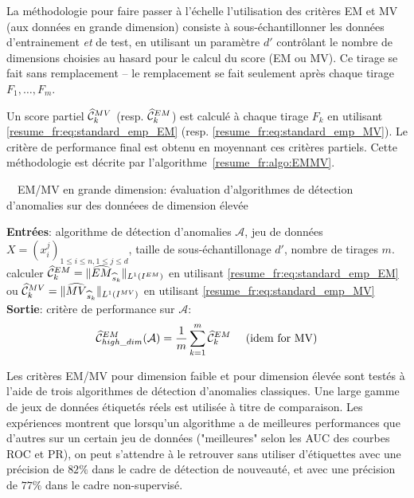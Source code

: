 La méthodologie pour faire passer à l'échelle l'utilisation des critères EM et MV (aux données en grande dimension) consiste à sous-échantillonner les données d'entrainement \emph{et} de test, en utilisant un paramètre $d'$ contrôlant le nombre de dimensions choisies au hasard pour le calcul du score (EM ou MV).
Ce tirage se fait sans remplacement -- le remplacement se fait seulement après chaque tirage $ F_1, \ldots, F_ {m} $.

Un score partiel $\widehat {\mathcal{C}}_k^{MV}$ (resp. $\widehat {\mathcal{C}}_k^{EM}$) est calculé à chaque tirage $F_k$ en utilisant \eqref{resume_fr:eq:standard_emp_EM} (resp. \eqref{resume_fr:eq:standard_emp_MV}). Le critère de performance final est obtenu en moyennant ces critères partiels. Cette méthodologie est décrite par l'algorithme~\ref{resume_fr:algo:EMMV}.
%
\begin{algorithm}[!tbh]
\caption{~~EM/MV en grande dimension: évaluation d'algorithmes de détection d'anomalies sur des donnéees de dimension élevée}
\label{resume_fr:algo:EMMV}
\begin{algorithmic}
  \STATE \textbf{Entrées}: algorithme de détection d'anomalies $\mathcal{A}$, jeu de données $X = (x^j_i)_{1 \le i \le n, 1 \le j \le d }$, taille de sous-échantillonage $d'$, nombre de tirages $m$.
    \STATE calculer $\widehat{\mathcal{C}}_k^{EM} = \| \widehat{EM}_{\widehat s_k} \|_{L^1(I^{EM})}$ en utilisant \eqref{resume_fr:eq:standard_emp_EM} ou $\widehat{\mathcal{C}}_k^{MV} = \| \widehat{MV}_{\widehat s_k} \|_{L^1(I^{MV})}$ en utilisant \eqref{resume_fr:eq:standard_emp_MV}
  \ENDFOR 
  \STATE \textbf{Sortie}: critère de performance sur $\mathcal{A}$: $$\widehat{\mathcal{C}}^{EM}_{high\_dim} (\mathcal{A})= \frac{1}{m} \sum_{k=1}^m\widehat {\mathcal{C}}_k^{EM} \text{~~~~(idem for MV)}$$
\end{algorithmic}
\end{algorithm}

Les critères EM/MV pour dimension faible et pour dimension élevée sont testés à l'aide de trois algorithmes de détection d'anomalies classiques. Une large gamme de jeux de données étiquetés réels est utilisée à titre de comparaison.
Les expériences montrent que lorsqu'un algorithme a de meilleures performances que d'autres sur un certain jeu de données ("meilleures" selon les AUC des courbes ROC et PR), on peut s'attendre à le retrouver sans utiliser d'étiquettes avec une précision de $82\% $ dans le cadre de détection de nouveauté, et avec une précision de $77\%$ dans le cadre non-supervisé.


